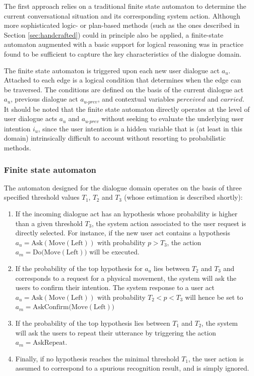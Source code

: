 The first approach relies on a traditional finite state automaton to determine the current conversational situation and its corresponding system action.  Although more sophisticated logic- or plan-based methods (such as the ones described in Section \ref{sec:handcrafted}) could in principle also be applied, a finite-state automaton augmented with a basic support for logical reasoning was in practice found to be sufficient to capture the key characteristics of the dialogue domain. 

The finite state automaton is triggered upon each new user dialogue act $a_u$. Attached to each edge is a logical condition that determines when the edge can be traversed. The conditions are defined on the basis of the current dialogue act $a_u$, previous dialogue act $a_{u\mbox{-}prev}$, and contextual variables $\mathit{perceived}$ and $\mathit{carried}$. It should be noted that the finite state automaton directly operates at the level of user dialogue acts $a_u$ and $a_{u\mbox{-}prev}$ without seeking to evaluate the underlying user intention $i_u$, since the user intention is a hidden variable that is (at least in this domain) intrinsically difficult to account without resorting to probabilistic methods.

\subsubsection*{Finite state automaton}

The automaton designed for the dialogue domain operates on the basis of three specified threshold values $T_1$, $T_2$ and $T_3$ (whose estimation is described shortly):
\begin{enumerate}
\item If the incoming dialogue act has an hypothesis whose probability is higher than a given threshold $T_3$, the system action associated to the user request is directly selected.  For instance, if the new user act contains a hypothesis $a_u = \mathrm{Ask(Move(Left))}$ with probability $p > T_3$, the action $a_m = \mathrm{Do(Move(Left)})$ will be executed.
\item If the probability of the top hypothesis for $a_u$ lies between $T_2$ and $T_3$ and corresponds to a request for a physical movement, the system will ask the users to confirm their intention.  The system response to a user act $a_u = \mathrm{Ask(Move(Left))}$ with probability $T_2 < p < T_3$ will hence be set to $a_m = \mathrm{AskConfirm(Move(Left)})$
\item If the probability of the top hypothesis lies between $T_1$ and $T_2$, the system will ask the users to repeat their utterance by triggering the action $a_m = \mathrm{AskRepeat}$. 
\item Finally, if no hypothesis reaches the minimal threshold $T_1$, the user action is assumed to correspond to a spurious recognition result, and is simply ignored.
\end{enumerate}

